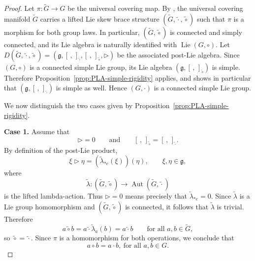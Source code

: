 \documentclass[reqno]{amsart}
\newcommand{\g}{\mathfrak{g}}
\DeclareMathOperator{\Lie}{Lie}
\DeclareMathOperator{\Aut}{Aut}
\begin{document}
\begin{proof}
Let
$\pi:\widetilde G\to G$
be the universal covering map. By \cite[Lemma~3.2]{DameleLoi2026}, the
universal covering manifold \(\widetilde G\) carries a lifted Lie skew brace
structure
$(\widetilde G,\widetilde\cdot,\widetilde\circ)$
such that \(\pi\) is a morphism for both group laws. In particular,
\((\widetilde G,\widetilde\circ)\) is connected and simply connected, and its
Lie algebra is naturally identified with
$\Lie(G,\circ)$.
Let
$D(\widetilde G,\widetilde\cdot,\widetilde\circ)
=
(\g,[\, ,\,]_{\widetilde\cdot},[\, ,\,]_{\widetilde\circ},\triangleright)$
be the associated post-Lie algebra. Since \((G,\circ)\) is a connected simple
Lie group, its Lie algebra
$(\g,[\, ,\,]_{\widetilde\circ})$
is simple. Therefore Proposition~\ref{prop:PLA-simple-rigidity} applies, and
shows in particular that
$(\g,[\, ,\,]_{\widetilde\cdot})$
is simple as well. Hence \((G,\cdot)\) is a connected simple Lie group.

We now distinguish the two cases given by
Proposition~\ref{prop:PLA-simple-rigidity}.

\medskip
\noindent
\textbf{Case 1.}
Assume that
\[
\triangleright=0
\qquad\text{and}\qquad
[\, ,\,]_{\widetilde\circ}=[\, ,\,]_{\widetilde\cdot}.
\]
By definition of the post-Lie product,
\[
\xi\triangleright \eta
=
(\widetilde\lambda_{*e}(\xi))(\eta),
\qquad \xi,\eta\in\g,
\]
where
\[
\widetilde\lambda:(\widetilde G,\widetilde\circ)\to
\Aut(\widetilde G,\widetilde\cdot)
\]
is the lifted lambda-action. Thus \(\triangleright=0\) means precisely that
$\widetilde\lambda_{*e}=0$.
Since \(\widetilde\lambda\) is a Lie group homomorphism and
\((\widetilde G,\widetilde\circ)\) is connected, it follows that
\(\widetilde\lambda\) is trivial. Therefore
\[
a\widetilde\circ b
=
a\widetilde\cdot \widetilde\lambda_a(b)
=
a\widetilde\cdot b
\qquad\text{for all }a,b\in \widetilde G,
\]
so
$\widetilde\circ=\widetilde\cdot.$
Since \(\pi\) is a homomorphism for both operations, we conclude that
\[
a\circ b=a\cdot b, \ \text{for all }a,b\in G.
\]


\end{proof}
\end{document}
